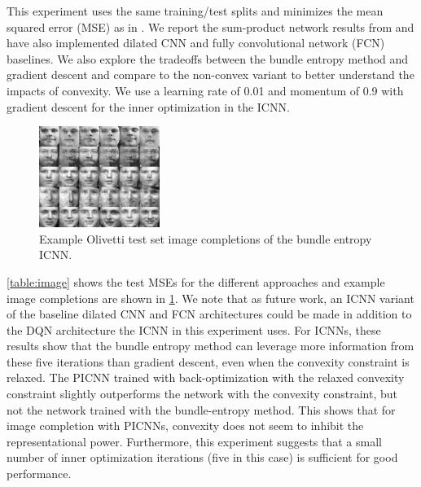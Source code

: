 This experiment uses the same training/test splits and minimizes
the mean squared error (MSE) as in
\citet{poon2011sum}.
We report the sum-product network results from \citet{poon2011sum}
and have also implemented dilated CNN
\citep{yu2015multi} and fully convolutional network (FCN)
\citep{long2015fully} baselines.
We also explore the tradeoffs between the bundle entropy method
and gradient descent and compare to the non-convex variant
to better understand the impacts of convexity.
We use a learning rate of 0.01 and momentum of 0.9 with
gradient descent for the inner optimization in the ICNN.

\begin{figure}[t]
  \centering
  \includegraphics[width=0.35\textwidth]{completion.png}
  \caption{Example Olivetti test set image completions of the bundle entropy ICNN.}
  \label{fig:images-completed}
\end{figure}

\cref{table:image} shows the test MSEs for the different approaches
and example image completions are shown in \cref{fig:images-completed}.
We note that as future work, an ICNN variant of the baseline dilated
CNN and FCN architectures could be made in addition to
the DQN architecture the ICNN in this experiment uses.
For ICNNs, these results show that the bundle entropy method can
leverage more information from these five iterations than gradient
descent, even when the convexity constraint is relaxed.
The PICNN trained with back-optimization with the relaxed convexity
constraint slightly outperforms the network with
the convexity constraint, but not the network trained with the
bundle-entropy method.
This shows that for image completion with PICNNs, convexity does not
seem to inhibit the representational power.
Furthermore, this experiment suggests that a small number of
inner optimization iterations (five in this case) is
sufficient for good performance.

